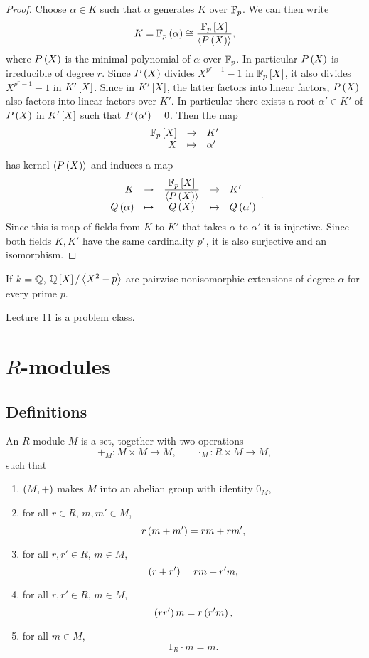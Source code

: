 \begin{proof}
Choose $ \alpha \in K $ such that $ \alpha $ generates $ K $ over $ \F_p $. We can then write
$$ K = \F_p\rb{\alpha} \cong \dfrac{\F_p\sb{X}}{\ab{P\rb{X}}}, $$
where $ P\rb{X} $ is the minimal polynomial of $ \alpha $ over $ \F_p $. In particular $ P\rb{X} $ is irreducible of degree $ r $. Since $ P\rb{X} $ divides $ X^{p^r - 1} - 1 $ in $ \F_p\sb{X} $, it also divides $ X^{p^r - 1} - 1 $ in $ K'\sb{X} $. Since in $ K'\sb{X} $, the latter factors into linear factors, $ P\rb{X} $ also factors into linear factors over $ K' $. In particular there exists a root $ \alpha' \in K' $ of $ P\rb{X} $ in $ K'\sb{X} $ such that $ P\rb{\alpha'} = 0 $. Then the map
$$ \function{\F_p\sb{X}}{K'}{X}{\alpha'} $$
has kernel $ \ab{P\rb{X}} $ and induces a map
$$
\begin{array}{rcccl}
K & \to & \dfrac{\F_p\sb{X}}{\ab{P\rb{X}}} & \to & K' \\
Q\rb{\alpha} & \mapsto & Q\rb{X} & \mapsto & Q\rb{\alpha'}
\end{array}.
$$
Since this is map of fields from $ K $ to $ K' $ that takes $ \alpha $ to $ \alpha' $ it is injective. Since both fields $ K, K' $ have the same cardinality $ p^r $, it is also surjective and an isomorphism.
\end{proof}

If $ k = \Q $, $ \Q\sb{X} / \ab{X^2 - p} $ are pairwise nonisomorphic extensions of degree $ \alpha $ for every prime $ p $.


Lecture 11 is a problem class.

\pagebreak

\section{$ R $-modules}


\subsection{Definitions}

\begin{definition}
An $ R $-module $ M $ is a set, together with two operations
$$ +_M : M \times M \to M, \qquad \cdot_M : R \times M \to M, $$
such that
\begin{enumerate}
\item $ \rb{M, +} $ makes $ M $ into an abelian group with identity $ 0_M $,
\item for all $ r \in R $, $ m, m' \in M $,
$$ r\rb{m + m'} = rm + rm', $$
\item for all $ r, r' \in R $, $ m \in M $,
$$ \rb{r + r'} = rm + r'm, $$
\item for all $ r, r' \in R $, $ m \in M $,
$$ \rb{rr'}m = r\rb{r'm}, $$
\item for all $ m \in M $,
$$ 1_R \cdot m = m. $$
\end{enumerate}
\end{definition}

